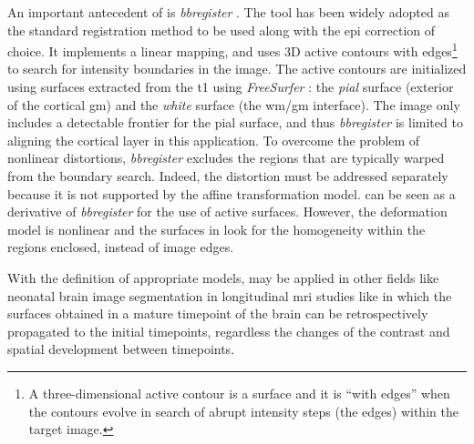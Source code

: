 {An important antecedent of \regseg{} is \emph{bbregister} \citep{greve_accurate_2009}.
The tool has been widely adopted as the standard registration method to be used along with the \gls*{epi}
  correction of choice.
It implements a linear mapping, and uses 3D active contours with edges\footnote{A three-dimensional active contour
  is a surface and it is ``with edges'' when the contours evolve in search of abrupt intensity steps
  (the edges) within the target image.} to search for intensity boundaries in the \lowb{} image.
The active contours are initialized using surfaces extracted from the \gls*{t1} using
  \emph{FreeSurfer} \citep{fischl_freesurfer_2012}: the \emph{pial} surface (exterior of the
  cortical \gls*{gm}) and the \emph{white} surface (the \gls*{wm}/\gls*{gm} interface).
The \lowb{} image only includes a detectable frontier for the pial surface, and thus
  \emph{bbregister} is limited to aligning the cortical layer in this
  application.
To overcome the problem of nonlinear distortions, \emph{bbregister} excludes the
  regions that are typically warped from the boundary search.
Indeed, the distortion must be addressed separately because it is not supported by
  the affine transformation model.
\Regseg{} can be seen as a derivative of \emph{bbregister} for the use of active surfaces.
However, the deformation model is nonlinear and the surfaces in \regseg{} look for the
  homogeneity within the regions enclosed, instead of image edges.}

With the definition of appropriate models, \regseg{} may be applied in other fields like
  neonatal brain image segmentation in longitudinal \gls*{mri} studies like \citep{shi_neonatal_2010}
  in which the surfaces obtained in a mature timepoint of the brain can be retrospectively
  propagated to the initial timepoints, regardless the changes of the contrast and spatial
  development between timepoints.

